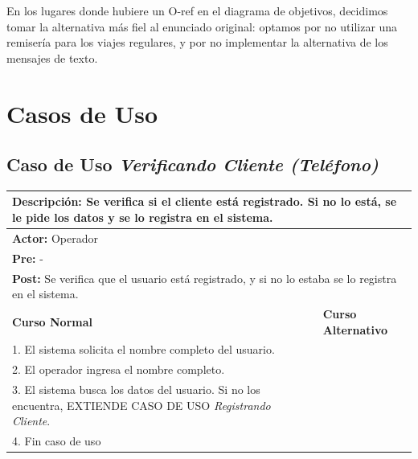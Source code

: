 \documentclass[a4paper]{article}
\begin{document}
En los lugares donde hubiere un O-ref en el diagrama de objetivos, decidimos tomar la alternativa m\'as fiel al enunciado original: optamos por no utilizar una remiser\'ia para los viajes regulares, y por no implementar la alternativa de los mensajes de texto.
\section{Casos de Uso}


\subsection{Caso de Uso \textit{Verificando Cliente (Tel\'efono)}}
\begin{center}
\begin{tabular}{|p{10cm} | p{6cm}|}
\hline
\multicolumn{2}{|p{16cm}|}{\textbf{Descripci\'on:} Se verifica si el cliente est\'a registrado. Si no lo est\'a, se le pide los datos y se lo registra en el sistema.} \\
\hline
\multicolumn{2}{|l|}{\textbf{Actor:} Operador} \\
\hline
\multicolumn{2}{|l|}{\textbf{Pre:} -} \\
\hline
\multicolumn{2}{|p{14cm}|}{\textbf{Post:} Se verifica que el usuario est\'a registrado, y si no lo estaba se lo registra en el sistema.}\\
\hline
\textbf{Curso Normal}  & \textbf{Curso Alternativo} \\ \hline
1. El sistema solicita el nombre completo del usuario. & \\ \hline
2. El operador ingresa el nombre completo. & \\ \hline
3. El sistema busca los datos del usuario. Si no los encuentra, EXTIENDE CASO DE USO \textit{Registrando Cliente}. & \\ \hline
4. Fin caso de uso & \\ \hline
\end{tabular}
\end{center}
\end{document}
